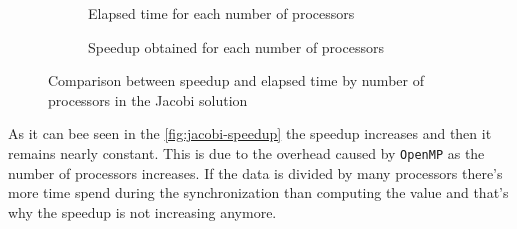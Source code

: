 \documentclass[a4paper]{article}
\newenvironment{questionenum}{%
\setlist[enumerate]{resume}
\restartlist{enumerate}
\newcommand{\question}[1]{
\begin{enumerate}
	\item\bfseries ##1
\end{enumerate}
}}{%
}
\begin{document}
\begin{questionenum}
	\begin{figure}[H]
		\begin{subfigure}[t]{0.49\textwidth}
			\caption{Elapsed time for each number of processors}
			\label{fig:jacobi-elapsed}
		\end{subfigure}
		\hfill
		\begin{subfigure}[t]{0.49\textwidth}		
			\caption{Speedup obtained for each number of processors}
			\label{fig:jacobi-speedup}
		\end{subfigure}
	\caption{Comparison between speedup and elapsed time by number of processors in the Jacobi solution}
	\end{figure}
\end{questionenum}

As it can bee seen in the \autoref{fig:jacobi-speedup} the speedup increases and then it remains nearly constant. This is due to the overhead caused by \texttt{OpenMP} as the number of processors increases. If the data is divided by many processors there's more time spend during the synchronization than computing the value and that's why the speedup is not increasing anymore.
\end{document}
